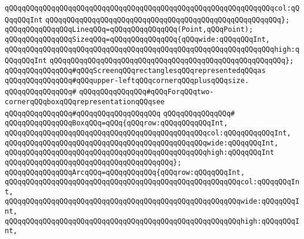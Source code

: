 \verb|qQQqqQQqqQQqqQQqqQQqqQQqqQQqqQQqqQQqqQQqqQQqqQQqqQQqqQQqqQQqqQQqcol:qQQqqQQqInt|\newline
\verb|qQQqqQQqqQQqqQQqqQQqqQQqqQQqqQQqqQQqqQQqqQQqqQQqqQQqqQQq};|\newline
\newline
\verb|qQQqqQQqqQQqqQQqLineqQQq=qQQqqQQqqQQqqQQq(Point,qQQqPoint);|\newline
\newline
\verb|qQQqqQQqqQQqqQQqSizeqQQq=qQQqqQQqqQQqqQQq{qQQqwide:qQQqqQQqInt,|\newline
\verb|qQQqqQQqqQQqqQQqqQQqqQQqqQQqqQQqqQQqqQQqqQQqqQQqqQQqqQQqqQQqqQQqhigh:qQQqqQQqInt|\newline
\verb|qQQqqQQqqQQqqQQqqQQqqQQqqQQqqQQqqQQqqQQqqQQqqQQqqQQqqQQq};|\newline
\newline
\verb|qQQqqQQqqQQqqQQq#qQQqScreenqQQqrectanglesqQQqrepresentedqQQqas|\newline
\verb|qQQqqQQqqQQqqQQq#qQQqupper-leftqQQqcornerqQQqplusqQQqsize.|\newline
\verb|qQQqqQQqqQQqqQQq#|\newline
\verb|qQQqqQQqqQQqqQQq#qQQqForqQQqtwo-cornerqQQqboxqQQqrepresentationqQQqsee|\newline
\verb|qQQqqQQqqQQqqQQq#qQQqqQQqqQQqqQQqqQQq|\newline
\verb|qQQqqQQqqQQqqQQq#|\newline
\verb|qQQqqQQqqQQqqQQqBoxqQQq=qQQq{qQQqrow:qQQqqQQqqQQqInt,|\newline
\verb|qQQqqQQqqQQqqQQqqQQqqQQqqQQqqQQqqQQqqQQqqQQqqQQqcol:qQQqqQQqqQQqInt,|\newline
\verb|qQQqqQQqqQQqqQQqqQQqqQQqqQQqqQQqqQQqqQQqqQQqqQQqwide:qQQqqQQqInt,|\newline
\verb|qQQqqQQqqQQqqQQqqQQqqQQqqQQqqQQqqQQqqQQqqQQqqQQqhigh:qQQqqQQqInt|\newline
\verb|qQQqqQQqqQQqqQQqqQQqqQQqqQQqqQQqqQQqqQQq};|\newline
\newline
\verb|qQQqqQQqqQQqqQQqArcqQQq=qQQqqQQqqQQq{qQQqrow:qQQqqQQqInt,|\newline
\verb|qQQqqQQqqQQqqQQqqQQqqQQqqQQqqQQqqQQqqQQqqQQqqQQqqQQqqQQqcol:qQQqqQQqInt,|\newline
\newline
\verb|qQQqqQQqqQQqqQQqqQQqqQQqqQQqqQQqqQQqqQQqqQQqqQQqqQQqqQQqwide:qQQqqQQqInt,|\newline
\verb|qQQqqQQqqQQqqQQqqQQqqQQqqQQqqQQqqQQqqQQqqQQqqQQqqQQqqQQqhigh:qQQqqQQqInt,|\newline
